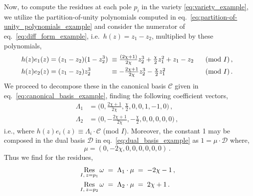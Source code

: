 \documentclass[dvipsnames,preprint,12pt,sort&compress]{elsarticle}
\begin{document}
Now, to compute the residues at each pole $p_i$ in the variety \eqref{eq:variety_example},
we utilize the partition-of-unity polynomials computed in
eq.~\eqref{eq:partition-of-unity_polynomials_example} and
consider the numerator of eq.~\eqref{eq:diff_form_example}, i.e.~$h(z) = z_1 - z_2$,
multiplied by these polynomials,
\begin{equation}
\begin{alignedat}{4}
  & h(z) e_1 (z)  && = (z_1 - z_2) (1 - z_2^3)  && \hspace{1mm} \equiv \textstyle{\frac{(2\chi+1)}{2\chi}} z_2^3
+ \textstyle{\frac{\chi}{2}} z_1^2 + z_1 - z_2  && \hspace{6mm} \mbox{(mod $I$)} \,, \\
  & h(z) e_2 (z)  && = (z_1 - z_2) z_2^3        && \hspace{1mm} \equiv -\textstyle{\frac{2\chi+1}{2\chi}} z_2^3
-\textstyle{\frac{\chi}{2}} z_1^2               && \hspace{6mm} \mbox{(mod $I$)} \,.
\end{alignedat}
\end{equation}
We proceed to decompose these in the canonical basis $\mathcal{C}$
given in eq.~\eqref{eq:canonical_basis_example}, finding the following coefficient
vectors,
\begin{align}
\Lambda_1 &= \big( 0, \textstyle{\frac{2\chi+1}{2\chi}},   \frac{\chi}{2},0,0,1,-1,0 \big) \,,\\
\Lambda_2 &= \big( 0, -\textstyle{\frac{2\chi+1}{2\chi}}, -\frac{\chi}{2},0,0,0,0,0 \big) \,,
\end{align}
i.e., where $h(z) e_i (z) \equiv \Lambda_i \cdot \mathcal{C}$ (mod $I$). Moreover,
the constant 1 may be composed in the dual basis $\mathcal{D}$
in eq.~\eqref{eq:dual_basis_example} as $1 = \mu \cdot \mathcal{D}$ where,
\begin{equation}
\mu = (0, -2\chi,0,0,0,0,0,0) \,.
\end{equation}
Thus we find for the residues,
\begin{equation}
\begin{alignedat}{4}
  & \mathop{\mathrm{Res}}_{I, \hspace{0.6mm} z=p_1} \omega && \hspace{1mm}=\hspace{1mm} \Lambda_1 \cdot \mu  && \hspace{1mm}=\hspace{1mm} -2 \chi -1 \,, \\
  & \mathop{\mathrm{Res}}_{I, \hspace{0.6mm} z=p_2} \omega && \hspace{1mm}=\hspace{1mm} \Lambda_2 \cdot \mu  && \hspace{1mm}=\hspace{1mm} 2 \chi +1 \,.
\end{alignedat}
\end{equation}
\end{document}

